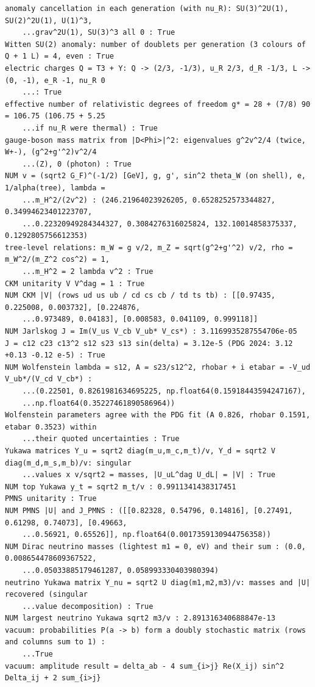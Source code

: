 \documentclass[10pt,a4paper]{article}
\begin{document}
\begin{Verbatim}[fontsize=\small,frame=single,framesep=2mm]
anomaly cancellation in each generation (with nu_R): SU(3)^2U(1), SU(2)^2U(1), U(1)^3,
    ...grav^2U(1), SU(3)^3 all 0 : True
Witten SU(2) anomaly: number of doublets per generation (3 colours of Q + 1 L) = 4, even : True
electric charges Q = T3 + Y: Q -> (2/3, -1/3), u_R 2/3, d_R -1/3, L -> (0, -1), e_R -1, nu_R 0
    ...: True
effective number of relativistic degrees of freedom g* = 28 + (7/8) 90 = 106.75 (106.75 + 5.25
    ...if nu_R were thermal) : True
gauge-boson mass matrix from |D<Phi>|^2: eigenvalues g^2v^2/4 (twice, W+-), (g^2+g'^2)v^2/4
    ...(Z), 0 (photon) : True
NUM v = (sqrt2 G_F)^(-1/2) [GeV], g, g', sin^2 theta_W (on shell), e, 1/alpha(tree), lambda =
    ...m_H^2/(2v^2) : (246.21964023926205, 0.6528252573344827, 0.34994623401223707,
    ...0.22320949284344327, 0.3084276316025824, 132.10014858375337, 0.1292805756612353)
tree-level relations: m_W = g v/2, m_Z = sqrt(g^2+g'^2) v/2, rho = m_W^2/(m_Z^2 cos^2) = 1,
    ...m_H^2 = 2 lambda v^2 : True
CKM unitarity V V^dag = 1 : True
NUM CKM |V| (rows ud us ub / cd cs cb / td ts tb) : [[0.97435, 0.225008, 0.003732], [0.224876,
    ...0.973489, 0.04183], [0.008583, 0.041109, 0.999118]]
NUM Jarlskog J = Im(V_us V_cb V_ub* V_cs*) : 3.1169935287554706e-05
J = c12 c23 c13^2 s12 s23 s13 sin(delta) = 3.12e-5 (PDG 2024: 3.12 +0.13 -0.12 e-5) : True
NUM Wolfenstein lambda = s12, A = s23/s12^2, rhobar + i etabar = -V_ud V_ub*/(V_cd V_cb*) :
    ...(0.22501, 0.8261981634695225, np.float64(0.15918443594247167),
    ...np.float64(0.35227461890586964))
Wolfenstein parameters agree with the PDG fit (A 0.826, rhobar 0.1591, etabar 0.3523) within
    ...their quoted uncertainties : True
Yukawa matrices Y_u = sqrt2 diag(m_u,m_c,m_t)/v, Y_d = sqrt2 V diag(m_d,m_s,m_b)/v: singular
    ...values x v/sqrt2 = masses, |U_uL^dag U_dL| = |V| : True
NUM top Yukawa y_t = sqrt2 m_t/v : 0.9911341438317451
PMNS unitarity : True
NUM PMNS |U| and J_PMNS : ([[0.82328, 0.54796, 0.14816], [0.27491, 0.61298, 0.74073], [0.49663,
    ...0.56921, 0.65526]], np.float64(0.0017359130944756358))
NUM Dirac neutrino masses (lightest m1 = 0, eV) and their sum : (0.0, 0.008654478609367522,
    ...0.05033885179461287, 0.058993330403980394)
neutrino Yukawa matrix Y_nu = sqrt2 U diag(m1,m2,m3)/v: masses and |U| recovered (singular
    ...value decomposition) : True
NUM largest neutrino Yukawa sqrt2 m3/v : 2.891316340688847e-13
vacuum: probabilities P(a -> b) form a doubly stochastic matrix (rows and columns sum to 1) :
    ...True
vacuum: amplitude result = delta_ab - 4 sum_{i>j} Re(X_ij) sin^2 Delta_ij + 2 sum_{i>j}

\end{Verbatim}
\end{document}
